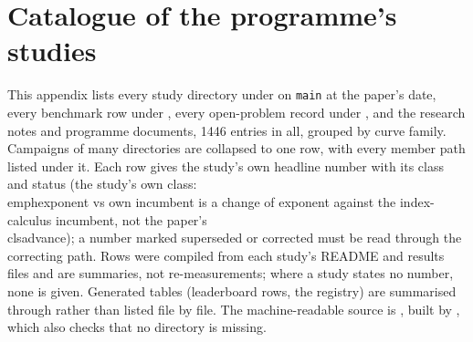 \section{Catalogue of the programme's studies}\label{sec:catalogue}

This appendix lists every study directory under  on \texttt{main} at the paper's date, every benchmark row under , every open-problem record under , and the research notes and  programme documents, 1446 entries in all, grouped by curve family. Campaigns of many directories are collapsed to one row, with every member path listed under it. Each row gives the study's own headline number with its class and status (the study's own class: \\emph{exponent vs own incumbent} is a change of exponent against the index-calculus incumbent, not the paper's \\cls{advance}); a number marked superseded or corrected must be read through the correcting path. Rows were compiled from each study's README and results files and are summaries, not re-measurements; where a study states no number, none is given. Generated tables (leaderboard rows, the registry) are summarised through  rather than listed file by file. The machine-readable source is , built by , which also checks that no directory is missing.


